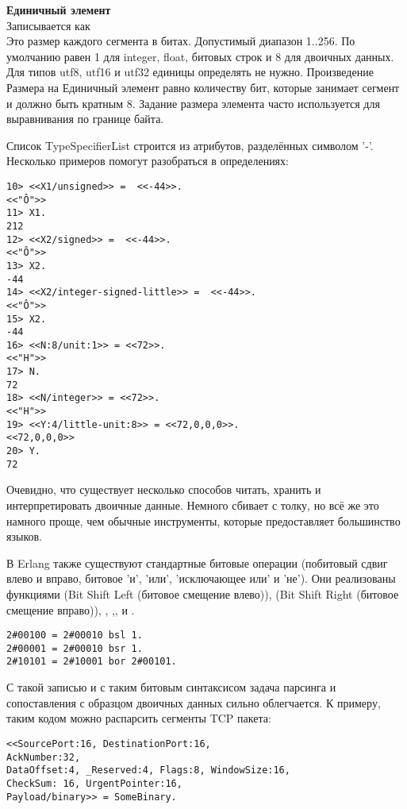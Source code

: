 \begin{minipage}{\textwidth}
    \textbf{Единичный элемент}\\ 
    Записывается как \\ 
    Это размер каждого сегмента в битах. Допустимый диапазон 1..256. По умолчанию равен 1 для integer, float, битовых строк и 8 для двоичных данных. Для типов utf8, utf16 и utf32 единицы определять не нужно. Произведение Размера на Единичный элемент равно количеству бит, которые занимает сегмент и должно быть кратным 8. Задание размера элемента часто используется для выравнивания по границе байта.\\  
\end{minipage}

Список TypeSpecifierList строится из атрибутов, разделённых символом '\--'.\\ 

Несколько примеров помогут разобраться в определениях:
\begin{lstlisting}[style=repl]
10> <<X1/unsigned>> =  <<-44>>.
<<"Ô">>
11> X1.
212
12> <<X2/signed>> =  <<-44>>. 
<<"Ô">>
13> X2.
-44
14> <<X2/integer-signed-little>> =  <<-44>>.
<<"Ô">>
15> X2.
-44
16> <<N:8/unit:1>> = <<72>>.
<<"H">>
17> N.
72
18> <<N/integer>> = <<72>>.
<<"H">>
19> <<Y:4/little-unit:8>> = <<72,0,0,0>>.     
<<72,0,0,0>>
20> Y.
72
\end{lstlisting}

Очевидно, что существует несколько способов читать, хранить и интерпретировать двоичные данные. Немного сбивает с толку, но всё же это намного проще, чем обычные инструменты, которые предоставляет большинство языков.

В Erlang также существуют стандартные битовые операции (побитовый сдвиг влево и вправо, битовое 'и', 'или', 'исключающее или' и 'не'). Они реализованы функциями  (Bit Shift Left (битовое смещение влево)),  (Bit Shift Right (битовое смещение вправо)), , ,, и .
\begin{lstlisting}[style=repl]
2#00100 = 2#00010 bsl 1.
2#00001 = 2#00010 bsr 1.
2#10101 = 2#10001 bor 2#00101.
\end{lstlisting}

С такой записью и с таким битовым синтаксисом задача парсинга и сопоставления с образцом двоичных данных сильно облегчается. К примеру, таким кодом можно распарсить сегменты TCP пакета:
\begin{lstlisting}[style=repl]
<<SourcePort:16, DestinationPort:16,
AckNumber:32,
DataOffset:4, _Reserved:4, Flags:8, WindowSize:16,
CheckSum: 16, UrgentPointer:16,
Payload/binary>> = SomeBinary.
\end{lstlisting}

